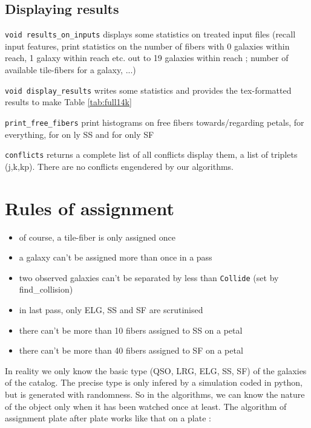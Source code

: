 \documentclass{article}
\begin{document}
\subsection{Displaying results}
{\tt void results\_on\_inputs} displays some statistics on treated input files (recall input features, print statistics on the number of fibers with 0 galaxies within reach, 1 galaxy within reach etc. out to 19 galaxies within reach ; number of available tile-fibers for a galaxy, ...)

{\tt void display\_results} writes some statistics and provides the tex-formatted results to make Table \ref{tab:full14k}

 {\tt print\_free\_fibers} print histograms on free fibers towards/regarding petals, for everything, for on ly SS and for only SF

 {\tt conflicts} returns a complete list of all conflicts display them, a list of triplets (j,k,kp). There are no conflicts engendered by our algorithms.
 
\section{Rules of assignment}
       \begin{itemize}
\item of course, a tile-fiber is only assigned once
\item a galaxy can't be assigned more than once in a pass
\item two observed galaxies can't be separated by less than {\tt Collide} (set by find\_collision)
\item in last pass, only ELG, SS and SF are scrutinised
\item there can't be more than 10 fibers assigned to SS on a petal
\item there can't be more than 40 fibers assigned to SF on a petal
       \end{itemize}

       In reality we only know the basic type (QSO, LRG, ELG, SS, SF) of the galaxies of the catalog. The precise type is only infered by a simulation coded in python, but is generated with randomness. So in the algorithms, we can know the nature of the object only when it has been watched once at least.
The algorithm of assignment plate after plate works like that on a plate :
\end{document}
